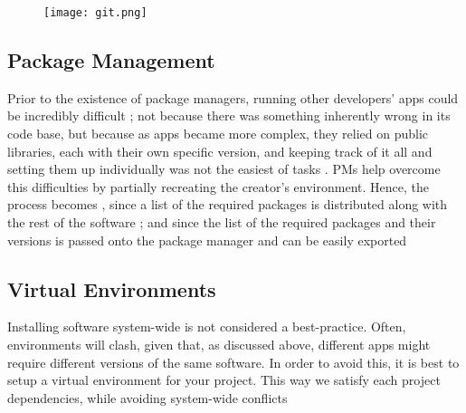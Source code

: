 	\begin{figure}[H]
			\texttt{[image: git.png]}
	\end{figure}




\subsection{Package Management}


	\par{Prior to the existence of package managers, running other
			developers' apps could be incredibly difficult ; not because there
			was something inherently wrong in its code base, but because as apps
			became more complex, they relied on public libraries, each with
			their own specific version, and keeping track of it all and setting
			them up individually was not the easiest of tasks
			\cite{ovens} . PMs help overcome this difficulties by partially
	recreating the creator's environment. Hence, the process becomes
	 , since a list of the required packages is distributed along
	with the rest of the software ;  and  since
	the list of the required packages and their versions is passed onto the
	package manager and can be easily exported}


\subsection{Virtual Environments}


	\par{Installing software system-wide is not considered a best-practice.
			Often, environments will clash, given that, as discussed above,
			different apps might require different versions of the same
			software. In order to avoid this, it is best to setup a virtual
			environment for your project. This way we satisfy each project
	dependencies, while avoiding system-wide conflicts}

